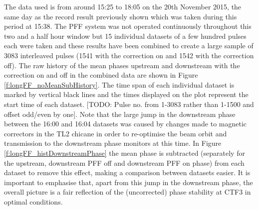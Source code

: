 The data used is from around 15:25 to 18:05 on the 20th November 2015, the same day as the record result previously shown which was taken during this period at 15:38. The PFF system was not operated continuously throughout this two and a half hour window but 15 individual datasets of a few hundred pulses each were taken and these results have been combined to create a large sample of 3083 interleaved pulses (1541 with the correction on and 1542 with the correction off). The raw history of the mean phases upstream and downstream with the correction on and off in the combined data are shown in Figure \ref{f:longFF_noMeanSubHistory}. The time span of each individual dataset is marked by vertical black lines and the times displayed on the plot represent the start time of each dataset. [TODO: Pulse no. from 1-3083 rather than 1-1500 and offset odd/even by one]. Note that the large jump in the downstream phase between the 16:00 and 16:04 datasets was caused by changes made to magnetic correctors in the TL2 chicane in order to re-optimise the beam orbit and transmission to the downstream phase monitors at this time. In Figure \ref{f:longFF_histDownstreamPhase} the mean phase is subtracted (separately for the upstream, downstream PFF off and downstream PFF on phase) from each dataset to remove this effect, making a comparison between datasets easier. It is important to emphasise that, apart from this jump in the downstream phase, the overall picture is a fair reflection of the (uncorrected) phase stability at CTF3 in optimal conditions. 


